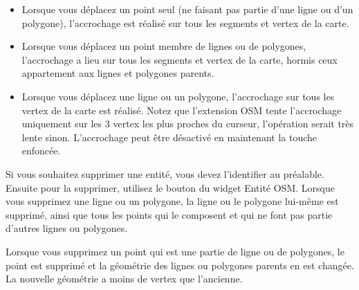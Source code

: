 \begin{itemize}[label=--]
\item Lorsque vous déplacez un point seul (ne faisant pas partie d'une ligne ou d'un polygone), l'accrochage est réalisé sur tous les segments et vertex de la carte.
\item Lorsque vous déplacez un point membre de lignes ou de polygones, l'accrochage a lieu sur tous les segments et vertex de la carte, hormis ceux appartement aux lignes et polygones parents.
\item Lorsque vous déplacez une ligne ou un polygone, l'accrochage sur tous les vertex de la carte est réalisé. Notez que l'extension OSM tente l'accrochage uniquement sur les 3 vertex les plus proches du curseur, l'opération serait très lente sinon. L'accrochage peut être désactivé en maintenant la touche  enfoncée.
\end{itemize}


Si vous souhaitez supprimer une entité, vous devez l'identifier au préalable. Ensuite pour la supprimer, utilisez le bouton  du widget Entité OSM. Lorsque vous supprimez une ligne ou un polygone, la ligne ou le polygone lui-même est supprimé, ainsi que tous les points qui le composent et qui ne font pas partie d'autres lignes ou polygones.

Lorsque vous supprimez un point qui est une partie de ligne ou de polygones, le point est supprimé et la géométrie des lignes ou polygones parents en est changée. La nouvelle géométrie a moins de vertex que l'ancienne.

